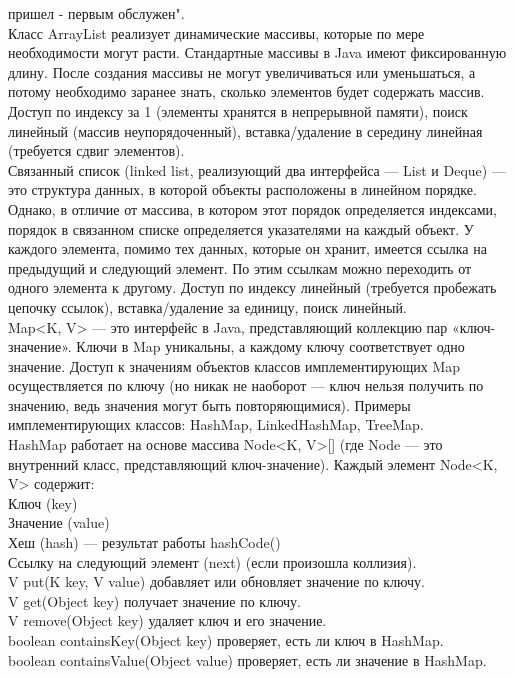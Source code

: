 {пришел - первым обслужен". \\
Класс ArrayList реализует динамические массивы, которые по мере необходимости могут расти. Стандартные массивы в Java имеют фиксированную длину. После создания массивы не могут увеличиваться или уменьшаться, а потому необходимо заранее знать, сколько элементов будет содержать массив. Доступ по индексу за 1 (элементы хранятся в непрерывной памяти), поиск линейный (массив неупорядоченный), вставка/удаление в середину линейная (требуется сдвиг элементов).  \\
Связанный список (linked list, реализующий два интерфейса — List и Deque) — это структура данных, в которой объекты расположены в линейном порядке. Однако, в отличие от массива, в котором этот порядок определяется индексами, порядок в связанном списке определяется указателями на каждый объект. У каждого элемента, помимо тех данных, которые он хранит, имеется ссылка на предыдущий и следующий элемент. По этим ссылкам можно переходить от одного элемента к другому. Доступ по индексу линейный (требуется пробежать цепочку ссылок), вставка/удаление за единицу, поиск линейный. \\
Map<K, V> — это интерфейс в Java, представляющий коллекцию пар «ключ-значение». Ключи в Map уникальны, а каждому ключу соответствует одно значение. Доступ к значениям объектов классов имплементирующих Map осуществляется по ключу (но никак не наоборот — ключ нельзя получить по значению, ведь значения могут быть повторяющимися). Примеры имплементирующих классов: HashMap, LinkedHashMap, TreeMap. \\
HashMap работает на основе массива Node<K, V>[] (где Node — это внутренний класс, представляющий ключ-значение).
Каждый элемент Node<K, V> содержит: \\
Ключ (key) \\
Значение (value) \\
Хеш (hash) — результат работы hashCode() \\
Ссылку на следующий элемент (next) (если произошла коллизия). \\
V put(K key, V value) добавляет или обновляет значение по ключу. \\
V get(Object key) получает значение по ключу. \\
V remove(Object key) удаляет ключ и его значение. \\
boolean containsKey(Object key) проверяет, есть ли ключ в HashMap. \\
boolean containsValue(Object value)	проверяет, есть ли значение в HashMap. \\
}
